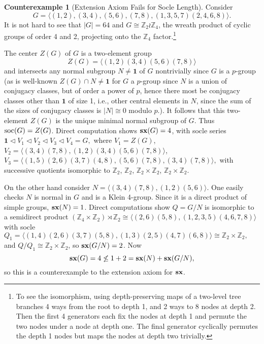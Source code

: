 \documentclass[a4paper,11pt]{amsart}
\theoremstyle{definition}
\newtheorem{counterexample}[example]{Counterexample}
\newcommand{\sx}{{\bf sx}}
\newcommand{\soc}{\mbox{\rm soc}}
\newcommand{\Z}{\mathbb{Z}}
\newcommand{\1}{{\mathbf 1}}
\begin{document}
\begin{counterexample}[Extension Axiom Fails for Socle Length]\label{pgroup}
Consider $$G= \langle (1,2), (3,4), (5,6), (7,8), (1,3,5,7)(2,4,6,8)\rangle.$$
It is not hard to see that $|G|=64$ and $G\cong {\mathbb Z}_2 \wr {\mathbb Z}_4$, the wreath product of cyclic groups of order 4 and 2, projecting onto the $\Z_4$ factor.\footnote{To see the isomorphism, using depth-preserving maps of a two-level tree branches 4 ways from the root to depth 1, and 2 ways to 8 nodes at depth 2. Then
the first 4 generators each fix the nodes at depth 1 and permute the two nodes under a node at depth one. The final generator cyclically permutes the depth 1 nodes but maps the nodes at depth two trivially. }

The center $Z(G)$ of $G$ is a two-element group $$Z(G)=\langle (1,2)(3,4)(5,6)(7,8)\rangle$$
and intersects any normal subgroup $N\neq \1$ of $G$ nontrivially since $G$ is a $p$-group 
(as is well-known $Z(G)\cap N\neq \1$ for $G$ a $p$-group since $N$ is a union of conjugacy classes, but of order a power of $p$, hence there
most be conjugacy classes other than $\1$ of size 1, i.e., other central elements in $N$, since the sum of the sizes of conjugacy classes is $|N|\cong 0$ modulo $p$.). 
It follows that this two-element $Z(G)$ is the unique minimal normal subgroup of $G$.  Thus $\soc(G)=Z(G)$.
Direct computation shows $\sx(G)=4$, with socle series\\ $\1\lhd V_1 \lhd V_2 \lhd V_3 \lhd V_4= G,$ where
$V_1=Z(G)$, $V_2= \langle (3,4)(7,8), (1,2)(3,4)(5,6)(7,8)\rangle$, $V_3=\langle (1,5)
  (2,6)(3,7)(4,8), (5,6)(7,8), (3,4)(7,8) \rangle, $
  with successive quotients isomorphic to $\Z_2$, $\Z_2$, $\Z_2\times \Z_2$, $\Z_2 \times \Z_2$.

On the other hand consider $N=\langle (3,4)(7,8), (1,2)(5,6) \rangle.$  
One easily checks $N$ is normal in $G$ and is a Klein 4-group.  Since it is a direct product of simple groups, $\sx(N)=1$.  Direct computations show $Q=G/N$ is isomorphic to a semidirect product $(\Z_4 \times \Z_2) \rtimes \Z_2 \cong \langle (2,6)(5,8), (1,2,3,5)(4,6,7,8)\rangle$ with socle
$Q_1=\langle (1,4)(2,6)(3,7)(5,8), (1,3)(2,5)(4,7)(6,8) \rangle \cong \Z_2 \times \Z_2,$ and
$Q/Q_1 \cong \Z_2\times \Z_2$, so $\sx(G/N)=2$.
Now $$\sx(G)=4 \not\leq 1+2 = \sx(N)+\sx(G/N),$$ so this is a counterexample to the extension axiom for $\sx$. 
\end{counterexample}  
\end{document}
